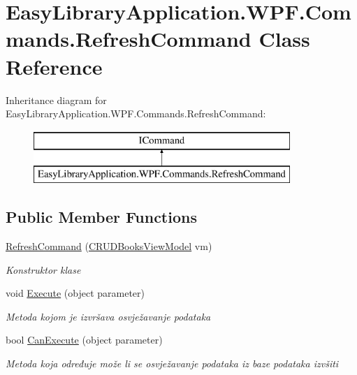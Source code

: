\hypertarget{class_easy_library_application_1_1_w_p_f_1_1_commands_1_1_refresh_command}{}\section{Easy\+Library\+Application.\+W\+P\+F.\+Commands.\+Refresh\+Command Class Reference}
\label{class_easy_library_application_1_1_w_p_f_1_1_commands_1_1_refresh_command}
Inheritance diagram for Easy\+Library\+Application.\+W\+P\+F.\+Commands.\+Refresh\+Command\+:\begin{figure}[H]
\begin{center}
\leavevmode
\includegraphics[height=2.000000cm]{class_easy_library_application_1_1_w_p_f_1_1_commands_1_1_refresh_command}
\end{center}
\end{figure}
\subsection*{Public Member Functions}
\begin{DoxyCompactItemize}
\item 
\mbox{\hyperlink{class_easy_library_application_1_1_w_p_f_1_1_commands_1_1_refresh_command_ac4b629b26c3e219c11ff1af0730a8156}{Refresh\+Command}} (\mbox{\hyperlink{class_easy_library_application_1_1_w_p_f_1_1_view_model_1_1_c_r_u_d_books_view_model}{C\+R\+U\+D\+Books\+View\+Model}} vm)
\begin{DoxyCompactList}\small\item\em Konstruktor klase \end{DoxyCompactList}\item 
void \mbox{\hyperlink{class_easy_library_application_1_1_w_p_f_1_1_commands_1_1_refresh_command_a09898c4475ff4676b330da32d5a01c8f}{Execute}} (object parameter)
\begin{DoxyCompactList}\small\item\em Metoda kojom je izvršava osvježavanje podataka \end{DoxyCompactList}\item 
bool \mbox{\hyperlink{class_easy_library_application_1_1_w_p_f_1_1_commands_1_1_refresh_command_a604b802d5ae152aa657d6697f5d5a200}{Can\+Execute}} (object parameter)
\begin{DoxyCompactList}\small\item\em Metoda koja određuje može li se osvježavanje podataka iz baze podataka izvšiti \end{DoxyCompactList}\end{DoxyCompactItemize}
